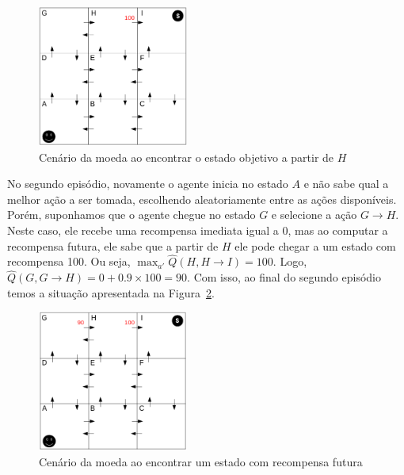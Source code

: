 \begin{figure}[h]
	\centering
	\includegraphics[width=0.44\textwidth]{img/exemplo-moeda-q-learning-2}
	\caption{Cenário da moeda ao encontrar o estado objetivo a partir de $H$}
	\label{fig:exemplo-moeda-q-learning-2}
\end{figure}

No segundo episódio, novamente o agente inicia no estado $A$ e não sabe qual a melhor ação a ser tomada, escolhendo aleatoriamente entre as ações disponíveis. Porém, suponhamos que o agente chegue no estado $G$ e selecione a ação $G \rightarrow H$. Neste caso, ele recebe uma recompensa imediata igual a 0, mas ao computar a recompensa futura, ele sabe que a partir de $H$ ele pode chegar a um estado com recompensa 100. Ou seja, $\max_{a'} \widehat{Q}(H, H \rightarrow I) = 100$. Logo, $\widehat{Q}(G, G \rightarrow H) = 0 + 0.9 \times 100 = 90$. Com isso, ao final do segundo episódio temos a situação apresentada na Figura~\ref{fig:exemplo-moeda-q-learning-3}.

\begin{figure}[h]
	\centering
	\includegraphics[width=0.44\textwidth]{img/exemplo-moeda-q-learning-3}
	\caption{Cenário da moeda ao encontrar um estado com recompensa futura}
	\label{fig:exemplo-moeda-q-learning-3}
\end{figure}

